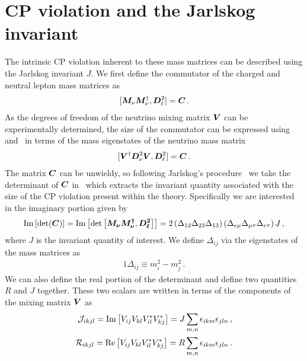 \section{CP violation and the Jarlskog invariant}\label{sec:jscalar}
\noindent The intrinsic CP violation inherent to these mass matrices can be described using the Jarlskog invariant $J$. We first define the commutator of the charged and neutral lepton mass matrices as 
\begin{alignat}{1}
	\label{comm:1} [\boldsymbol{M}_{\nu}\boldsymbol{M}_{\nu}^{\dagger},\boldsymbol{D}_{\ell}^{2}] = \boldsymbol{C}\,.
\end{alignat}
As the degrees of freedom of the neutrino mixing matrix $\boldsymbol{V}$ can be experimentally determined, the size of the commutator can be expressed using~ and~ in terms of the mass eigenstates of the neutrino mass matrix
\begin{alignat}{1}
	\label{comm:2} [\boldsymbol{V}^{\dagger}\boldsymbol{D}_{\nu}^{2}\boldsymbol{V},\boldsymbol{D}_{\ell}^{2}] = \boldsymbol{C}\,.
\end{alignat}
The matrix $\boldsymbol{C}$ can be unwieldy, so following Jarlskog's procedure~\citep{jarlskog1985commutator,jarlskog1985basis,jarlskog2005invariants} we take the determinant of $\boldsymbol{C}$ in~ which extracts the invariant quantity associated with the size of the CP violation present within the theory. Specifically we are interested in the imaginary portion given by
\begin{alignat}{1}
	\label{det:1} \mathrm{Im}\left[\mathrm{det}(\boldsymbol{C})\right]=\mathrm{Im}\left[\mathrm{det}\left[\boldsymbol{M_{\nu}}\boldsymbol{M_{\nu}^{\dagger}},\boldsymbol{D_{\ell}^{2}}\right]\right]=2\left(\Delta_{12}\Delta_{23}\Delta_{13}\right)\left(\Delta_{e\mu}\Delta_{\mu\tau}\Delta_{e\tau}\right)J\,,
\end{alignat}
where $J$ is the invariant quantity of interest. We define $\Delta_{ij}$ via the eigenstates of the mass matrices as
\begin{alignat}{1}
	\label{delta:1} \Delta_{ij}\equiv m^{2}_{i}-m^{2}_{j}\,.
\end{alignat}
We can also define the real portion of the determinant and define two quantities $R$ and $J$ together. These two scalars are written in terms of the components of the mixing matrix $\boldsymbol{V}$ as
\begin{alignat}{1}
	\label{j:1}
    {\cal J}_{ikjl} = \mathrm{Im}\left[V_{ij}V_{kl}V^{*}_{il}V^{*}_{kj}\right]=J\sum_{m,n}\epsilon_{ikm}\epsilon_{jln}\,,\\
    \label{j:2}
    {\cal R}_{ikjl} = \mathrm{Re}\left[V_{ij}V_{kl}V^{*}_{il}V^{*}_{kj}\right]=R\sum_{m,n}\epsilon_{ikm}\epsilon_{jln}\,.
\end{alignat}
